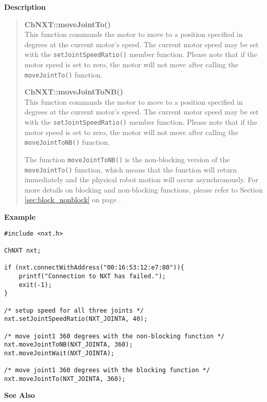 \noindent
{\bf Description}\\
\vspace{-12pt}
\begin{quote}
{\bf ChNXT::moveJointTo()}\\
This function commands the motor to move to a position specified 
in degrees at the current motor's speed. The current motor speed 
may be set with the \texttt{setJointSpeedRatio()} member function.
Please note that if the motor speed is set to zero, the motor will
not move after calling the \texttt{moveJointTo()} function. 

{\bf ChNXT::moveJointToNB()}\\
This function commands the motor to move to a position specified 
in degrees at the current motor's speed. The current motor speed 
may be set with the \texttt{setJointSpeedRatio()} member function.
Please note that if the motor speed is set to zero, the motor will
not move after calling the \texttt{moveJointToNB()} function. 

The function \texttt{moveJointToNB()} is the non-blocking version 
of the \texttt{moveJointTo()} function, which means that the 
function will return immediately and the physical robot motion 
will occur asynchronously. For more details on blocking and 
non-blocking functions, please refer to Section \ref{sec:block_nonblock}
on page \pageref{sec:block_nonblock}.\\
\end{quote}

\noindent
{\bf Example}
\begin{lstlisting}
#include <nxt.h> 

ChNXT nxt;

if (nxt.connectWithAddress("00:16:53:12:e7:80")){
    printf("Connection to NXT has failed.");
    exit(-1);
}
 
/* setup speed for all three joints */
nxt.setJointSpeedRatio(NXT_JOINTA, 40);

/* move joint1 360 degrees with the non-blocking function */
nxt.moveJointToNB(NXT_JOINTA, 360);
nxt.moveJointWait(NXT_JOINTA);

/* move joint1 360 degrees with the blocking function */
nxt.moveJointTo(NXT_JOINTA, 360);
\end{lstlisting}

\noindent
{\bf See Also}\\

